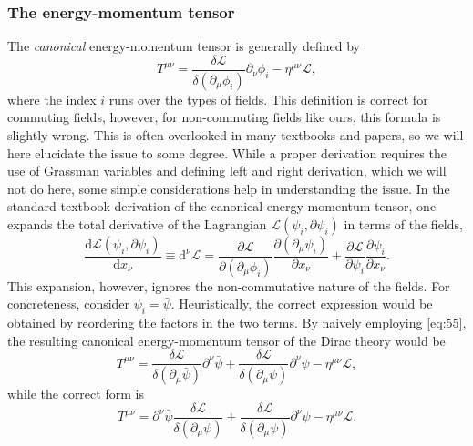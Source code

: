 \subsubsection{The energy-momentum tensor}
The \emph{canonical} energy-momentum tensor is generally defined by
\begin{equation}
  \label{eq:55}
  T^{\mu \nu} =  \frac{\delta \mathcal{L}}{\delta(\partial_{\mu} \phi_{i})} \partial_{\nu} \phi_i - \eta^{\mu \nu} \mathcal{L},
\end{equation}
where the index \( i \) runs over the types of fields.
This definition is correct for commuting fields, however, for non-commuting fields like ours, this formula is slightly wrong.
This is often overlooked in many textbooks and papers, so we will here elucidate the issue to some degree.
While a proper derivation requires the use of Grassman variables and defining left and right derivation, which we will not do here, some simple considerations help in understanding the issue.
In the standard textbook derivation of the canonical energy-momentum tensor, one expands the total derivative of the Lagrangian \( \mathcal{L}(\psi_i, \partial \psi_i)\) in terms of the fields,
\begin{equation}
  \label{eq:56}
  \frac{\mathrm{d} \mathcal{L}(\psi_{i}, \partial \psi_i)}{\mathrm{d} x_{\nu }} \equiv \mathrm{d}^{\nu } \mathcal{L}
  = \frac{\partial \mathcal{L}}{\partial (\partial_{\mu } \phi_i)} \frac{\partial(\partial _{\mu } \psi_i)}{\partial x_{\nu }}
  + \frac{\partial \mathcal{L}}{\partial \psi _{i}} \frac{\partial \psi_i}{\partial x_{\nu }}.
\end{equation}
This expansion, however, ignores the non-commutative nature of the fields.
For concreteness, consider \( \psi _i = \bar{\psi} \).
Heuristically, the correct expression would be obtained by reordering the factors in the two terms.
By naively employing \cref{eq:55}, the resulting canonical energy-momentum tensor of the Dirac theory would be
\begin{equation}
  T^{\mu \nu} = \frac{\delta \mathcal{L}}{\delta (\partial_{\mu} \bar{\psi})} \partial^{\nu} \bar{\psi}  + \frac{\delta \mathcal{L}}{\delta (\partial_{\mu} \psi)} \partial^{\nu} \psi - \eta^{\mu \nu} \mathcal{L},
\end{equation}
while the correct form is~\cite[Eq.~(3-153)]{itzyksonQuantumFieldTheory1980}
\begin{equation}
  \label{eq:57}
  T^{\mu \nu} = \partial^{\nu} \bar{\psi} \frac{\delta \mathcal{L}}{\delta (\partial_{\mu} \bar{\psi})} + \frac{\delta \mathcal{L}}{\delta (\partial_{\mu} \psi)} \partial^{\nu} \psi - \eta^{\mu \nu} \mathcal{L}.
\end{equation}

